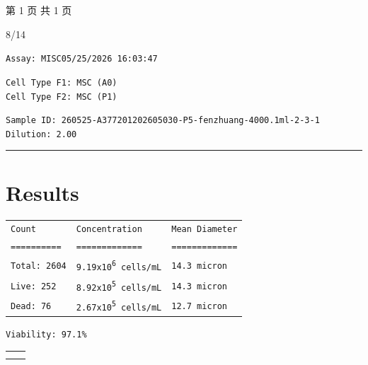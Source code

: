 \documentclass[UTF8,10pt,a4paper,fontset=fandol]{ctexart}
\newcommand{\handwritten}[1]{#1}
\begin{document}
\vfill
\begin{center}
第 1 页 共 1 页
\end{center}

\handwritten{8/14}

\newpage

\begin{flushleft}
\texttt{Assay: MISC}\hfill\texttt{05/25/2026 16:03:47}

\vspace{0.5em}

\texttt{Cell Type F1: MSC (A0)}\\
\texttt{Cell Type F2: MSC (P1)}

\vspace{0.5em}

\texttt{Sample ID: 260525-A377201202605030-P5-fenzhuang-4000.1ml-2-3-1}\\
\texttt{Dilution: 2.00}

\noindent\rule{\textwidth}{0.4pt}

\section*{Results}

\begin{tabularx}{\textwidth}{l X X}
\texttt{Count} & \texttt{Concentration} & \texttt{Mean Diameter}\\
\texttt{==========} & \texttt{=============} & \texttt{=============}\\
\texttt{Total: 2604} & \texttt{9.19x10\textsuperscript{6} cells/mL} & \texttt{14.3 micron}\\
\texttt{Live: 252} & \texttt{8.92x10\textsuperscript{5} cells/mL} & \texttt{14.3 micron}\\
\texttt{Dead: 76} & \texttt{2.67x10\textsuperscript{5} cells/mL} & \texttt{12.7 micron}
\end{tabularx}

\vspace{0.75em}

\texttt{Viability: 97.1\%}

\vspace{1em}

\begin{center}
\begin{tabular}{cc}
\fbox{\rule{0pt}{3.1cm}\rule{0.42\textwidth}{0pt}} &
\fbox{\rule{0pt}{3.1cm}\rule{0.42\textwidth}{0pt}} \\[1.2em]
\fbox{\rule{0pt}{3.1cm}\rule{0.42\textwidth}{0pt}} &
\fbox{\rule{0pt}{3.1cm}\rule{0.42\textwidth}{0pt}}
\end{tabular}
\end{center}


\end{flushleft}
\end{document}
